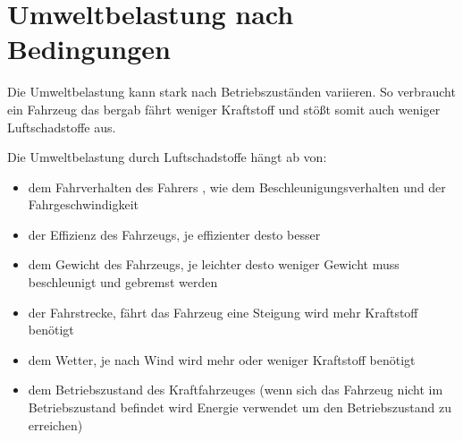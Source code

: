 
\section{Umweltbelastung nach Bedingungen}
Die Umweltbelastung kann stark nach Betriebszuständen variieren.
So verbraucht ein Fahrzeug das bergab fährt weniger Kraftstoff und stößt somit auch weniger Luftschadstoffe aus.

Die Umweltbelastung durch Luftschadstoffe hängt ab von:
\begin{itemize}
	\item dem Fahrverhalten des Fahrers , wie dem Beschleunigungsverhalten und der Fahrgeschwindigkeit
	\item der Effizienz des Fahrzeugs, je effizienter desto besser
	\item dem Gewicht des Fahrzeugs, je leichter desto weniger Gewicht muss beschleunigt und gebremst werden
	\item der Fahrstrecke, fährt das Fahrzeug eine Steigung wird mehr Kraftstoff benötigt
	\item dem Wetter, je nach Wind wird mehr oder weniger Kraftstoff benötigt
	\item dem Betriebszustand des Kraftfahrzeuges (wenn sich das Fahrzeug nicht im Betriebszustand befindet wird Energie verwendet um den Betriebszustand zu erreichen)
\end{itemize}

